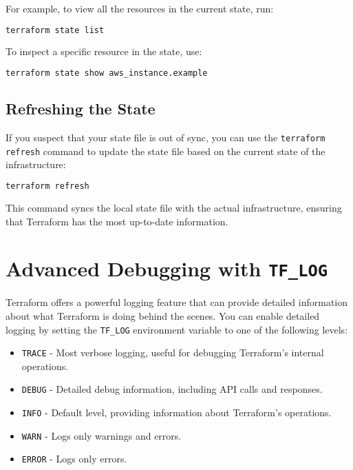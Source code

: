 For example, to view all the resources in the current state, run:

\begin{lstlisting}[language=bash]
terraform state list
\end{lstlisting}

To inspect a specific resource in the state, use:

\begin{lstlisting}[language=bash]
terraform state show aws_instance.example
\end{lstlisting}

\subsection{Refreshing the State}

If you suspect that your state file is out of sync, you can use the \texttt{terraform refresh} command to update the state file based on the current state of the infrastructure:

\begin{lstlisting}[language=bash]
terraform refresh
\end{lstlisting}

This command syncs the local state file with the actual infrastructure, ensuring that Terraform has the most up-to-date information.

\section{Advanced Debugging with \texttt{TF\_LOG}}

Terraform offers a powerful logging feature that can provide detailed information about what Terraform is doing behind the scenes. You can enable detailed logging by setting the \texttt{TF\_LOG} environment variable to one of the following levels:

\begin{itemize}
  \item \texttt{TRACE} - Most verbose logging, useful for debugging Terraform's internal operations.
  \item \texttt{DEBUG} - Detailed debug information, including API calls and responses.
  \item \texttt{INFO} - Default level, providing information about Terraform's operations.
  \item \texttt{WARN} - Logs only warnings and errors.
  \item \texttt{ERROR} - Logs only errors.
\end{itemize}

